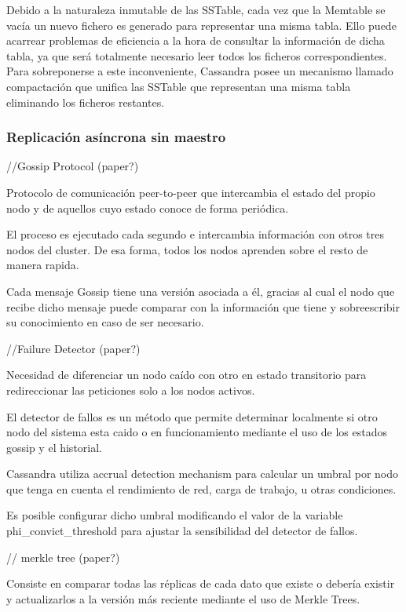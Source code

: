 Debido a la naturaleza inmutable de las SSTable, cada vez que la Memtable se vacía un nuevo fichero es generado para representar una misma tabla. Ello puede acarrear problemas de eficiencia a la hora de consultar la información de dicha tabla, ya que será totalmente necesario leer todos los ficheros correspondientes. Para sobreponerse a este inconveniente, Cassandra posee un mecanismo llamado compactación que unifica las SSTable que representan una misma tabla eliminando los ficheros restantes.

\subsubsection{Replicación asíncrona sin maestro}

//Gossip Protocol (paper?)

Protocolo de comunicación peer-to-peer que intercambia el estado del propio nodo y de aquellos cuyo estado conoce de forma periódica.

El proceso es ejecutado cada segundo e intercambia información con otros tres nodos del cluster. De esa forma, todos los nodos aprenden sobre el resto de manera rapida.

Cada mensaje Gossip tiene una versión asociada a él, gracias al cual el nodo que recibe dicho mensaje puede comparar con la información que tiene y sobreescribir su conocimiento en caso de ser necesario.

//Failure Detector (paper?)

Necesidad de diferenciar un nodo caído con otro en estado transitorio para redireccionar las peticiones solo a los nodos activos.

El detector de fallos es un método que permite determinar localmente si otro nodo del sistema esta caido o en funcionamiento mediante el uso de los estados gossip y el historial.

Cassandra utiliza accrual detection mechanism para calcular un umbral por nodo que tenga en cuenta el rendimiento de red, carga de trabajo, u otras condiciones.

Es posible configurar dicho umbral modificando el valor de la variable phi_convict_threshold para ajustar la sensibilidad del detector de fallos.

// merkle tree (paper?)

Consiste en comparar todas las réplicas de cada dato que existe o debería existir y actualizarlos a la versión más reciente mediante el uso de Merkle Trees.

